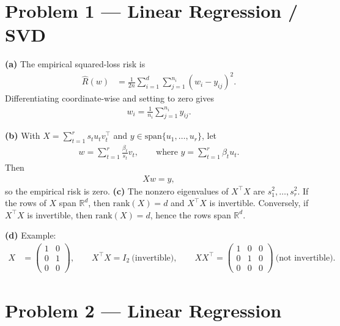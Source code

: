 \documentclass[11pt]{article}
\begin{document}
\section*{Problem 1 --- Linear Regression / SVD}

\noindent\textbf{(a)} The empirical squared-loss risk is
\begin{align*}
\hat R(w) &= \frac{1}{2n}\sum_{i=1}^d \sum_{j=1}^{n_i} (w_i - y_{ij})^2.
\end{align*}
Differentiating coordinate-wise and setting to zero gives
\begin{align*}
w_i = \frac{1}{n_i}\sum_{j=1}^{n_i} y_{ij}.
\end{align*}

\noindent\textbf{(b)} With $X = \sum_{t=1}^r s_t u_t v_t^\top$ and $y \in \text{span}\{u_1,\dots,u_r\}$, let
\begin{align*}
w = \sum_{t=1}^r \frac{\beta_t}{s_t} v_t, \qquad \text{where } y = \sum_{t=1}^r \beta_t u_t.
\end{align*}
Then
\begin{align*}
Xw = y,
\end{align*}
so the empirical risk is zero.
\vspace{1em} 
\newline
\noindent\textbf{(c)} The nonzero eigenvalues of $X^\top X$ are $s_1^2,\dots,s_r^2$.  
If the rows of $X$ span $\mathbb{R}^d$, then $\text{rank}(X)=d$ and $X^\top X$ is invertible.  
Conversely, if $X^\top X$ is invertible, then $\text{rank}(X)=d$, hence the rows span $\mathbb{R}^d$.

\vspace{1em} 

\noindent\textbf{(d)} Example:
\begin{align*}
X &= \begin{pmatrix} 1 & 0 \\ 0 & 1 \\ 0 & 0 \end{pmatrix}, \qquad
X^\top X = I_2 \ \text{(invertible)}, \qquad
XX^\top = \begin{pmatrix} 1 & 0 & 0 \\ 0 & 1 & 0 \\ 0 & 0 & 0 \end{pmatrix} \ \text{(not invertible)}.
\end{align*}

\section*{Problem 2 --- Linear Regression}
\end{document}
